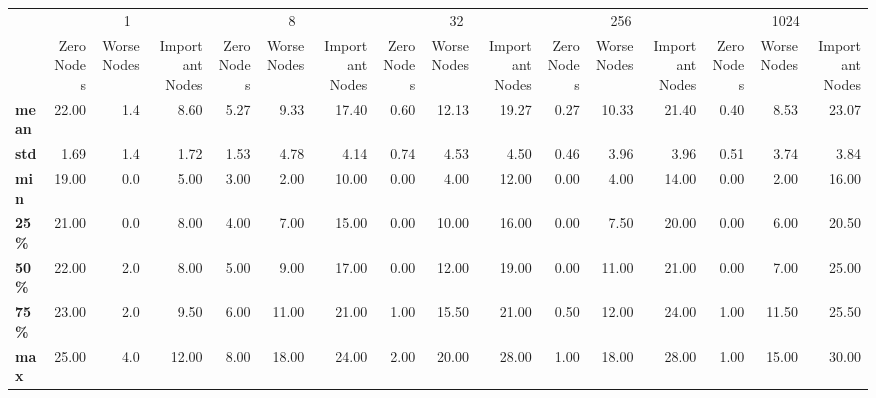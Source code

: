 \begin{tabular}{lrrrrrrrrrrrrrrr}
\toprule
{} & \multicolumn{3}{c}{1} & \multicolumn{3}{c}{8} & \multicolumn{3}{c}{32} & \multicolumn{3}{c}{256} & \multicolumn{3}{c}{1024} \\
{} & Zero Nodes & Worse Nodes & Important Nodes & Zero Nodes & Worse Nodes & Important Nodes & Zero Nodes & Worse Nodes & Important Nodes & Zero Nodes & Worse Nodes & Important Nodes & Zero Nodes & Worse Nodes & Important Nodes \\
\midrule
\textbf{mean} &      22.00 &         1.4 &            8.60 &       5.27 &        9.33 &           17.40 &       0.60 &       12.13 &           19.27 &       0.27 &       10.33 &           21.40 &       0.40 &        8.53 &           23.07 \\
\textbf{std } &       1.69 &         1.4 &            1.72 &       1.53 &        4.78 &            4.14 &       0.74 &        4.53 &            4.50 &       0.46 &        3.96 &            3.96 &       0.51 &        3.74 &            3.84 \\
\textbf{min } &      19.00 &         0.0 &            5.00 &       3.00 &        2.00 &           10.00 &       0.00 &        4.00 &           12.00 &       0.00 &        4.00 &           14.00 &       0.00 &        2.00 &           16.00 \\
\textbf{25\% } &      21.00 &         0.0 &            8.00 &       4.00 &        7.00 &           15.00 &       0.00 &       10.00 &           16.00 &       0.00 &        7.50 &           20.00 &       0.00 &        6.00 &           20.50 \\
\textbf{50\% } &      22.00 &         2.0 &            8.00 &       5.00 &        9.00 &           17.00 &       0.00 &       12.00 &           19.00 &       0.00 &       11.00 &           21.00 &       0.00 &        7.00 &           25.00 \\
\textbf{75\% } &      23.00 &         2.0 &            9.50 &       6.00 &       11.00 &           21.00 &       1.00 &       15.50 &           21.00 &       0.50 &       12.00 &           24.00 &       1.00 &       11.50 &           25.50 \\
\textbf{max } &      25.00 &         4.0 &           12.00 &       8.00 &       18.00 &           24.00 &       2.00 &       20.00 &           28.00 &       1.00 &       18.00 &           28.00 &       1.00 &       15.00 &           30.00 \\
\bottomrule
\end{tabular}
